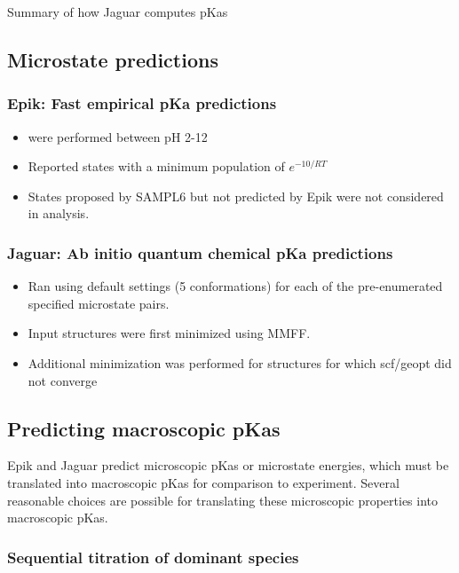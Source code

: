 \documentclass[9pt,lineno,final]{elife}
\begin{document}
Summary of how Jaguar computes pKas  

\subsection{Microstate predictions}

\subsubsection{Epik: Fast empirical pKa predictions}
\begin{itemize}
	\item were performed between pH 2-12
	\item Reported states with a minimum population of $e^{-10/RT}$
	\item States proposed by SAMPL6 but not predicted by Epik were not considered in analysis.
	      
\end{itemize}


\subsubsection{Jaguar: Ab initio quantum chemical pKa predictions}
\begin{itemize}
	\item Ran using default settings (5 conformations) for each of the pre-enumerated specified microstate pairs.
	\item Input structures were first minimized using MMFF.
	\item Additional minimization was performed for structures for which scf/geopt did not converge
\end{itemize}

\subsection{Predicting macroscopic pKas}

Epik and Jaguar predict microscopic pKas or microstate energies, which must be translated into macroscopic pKas for comparison to experiment.
Several reasonable choices are possible for translating these microscopic properties into macroscopic pKas.

\subsubsection{Sequential titration of dominant species} 
\end{document}
